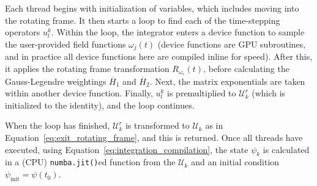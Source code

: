 \documentclass{jors}
\begin{document}
		Each thread begins with initialization of variables, which includes moving into the rotating frame.
		It then starts a loop to find each of the time-stepping operators $ u^k_l $.
		Within the loop, the integrator enters a device function to sample the user-provided field functions $ \omega_j(t) $ (device functions are GPU subroutines, and in practice all device functions here are compiled inline for speed).
		After this, it applies the rotating frame transformation $R_{\omega_r}(t)$, before calculating the Gauss-Legendre weightings $ \overline{H}_1 $ and $ \overline{H}_2 $. Next, the matrix exponentials are taken within another device function.
		Finally, $ u^k_l $ is premultiplied to $ \mathcal{U}^r_k $ (which is initialized to the identity), and the loop continues.
		
		When the loop has finished, $ \mathcal{U}^r_k $ is transformed to $ \mathcal{U}_k $ as in Equation~\eqref{eq:exit_rotating_frame}, and this is returned.
		Once all threads have executed, using Equation~\eqref{eq:integration_compilation}, the state $ \psi_k $ is calculated in a (CPU) \texttt{numba.jit()}ed function from the $ \mathcal{U}_k $ and an initial condition $ \psi_{\text{init}} = \psi(t_0) $.
\end{document}
